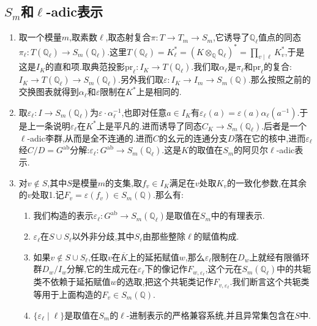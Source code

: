 \subsection{$S_m$和$\ell$-adic表示}
\begin{enumerate}
	\item 取一个模量$m$,取素数$\ell$,取态射复合$\pi:T\to T_m\to S_m$,它诱导了$\mathbb{Q}_{\ell}$值点的同态$\pi_{\ell}:T(\mathbb{Q}_{\ell})\to S_m(\mathbb{Q}_{\ell})$.这里$T(\mathbb{Q}_{\ell})=K_{\ell}^*=(K\otimes_{\mathbb{Q}}\mathbb{Q}_{\ell})^*=\prod_{v\mid\ell}K_v^*$,于是这是$I_K$的直和项.取典范投影$\mathrm{pr}_{\ell}:I_K\to T(\mathbb{Q}_{\ell})$.我们取$\alpha_{\ell}$是$\pi_{\ell}$和$\mathrm{pr}_{\ell}$的复合:$I_K\to T(\mathbb{Q}_{\ell})\to S_m(\mathbb{Q}_{\ell})$.另外我们取$\varepsilon:I_K\to I_m\to S_m(\mathbb{Q})$.那么按照之前的交换图表就得到$\alpha_{\ell}$和$\varepsilon$限制在$K^*$上是相同的.
	\item 取$\varepsilon_{\ell}:I\to S_m(\mathbb{Q}_{\ell})$为$\varepsilon\cdot\alpha_{\ell}^{-1}$,也即对任意$a\in I_K$有$\varepsilon_{\ell}(a)=\varepsilon(a)\alpha_{\ell}(a^{-1})$.于是上一条说明$\varepsilon_{\ell}$在$K^*$上是平凡的.进而诱导了同态$C_K\to S_m(\mathbb{Q}_{\ell})$.后者是一个$\ell$-adic李群,从而是全不连通的.进而$C$的幺元的连通分支$D$落在它的核中,进而$\varepsilon_{\ell}$经$C/D=G^{\mathrm{ab}}$分解:$\varepsilon_{\ell}:G^{\mathrm{ab}}\to S_m(\mathbb{Q}_{\ell})$.这是$K$的取值在$S_m$的阿贝尔$\ell$-adic表示.
	\item 对$v\not\in S$,其中$S$是模量$m$的支集,取$f_v\in I_K$满足在$v$处取$K_v$的一致化参数,在其余的$v$处取1.记$F_v=\varepsilon(f_v)\in S_m(\mathbb{Q})$.那么有:
	\begin{enumerate}[(1)]
		\item 我们构造的表示$\varepsilon_{\ell}:G^{\mathrm{ab}}\to S_m(\mathbb{Q}_{\ell})$是取值在$S_m$中的有理表示.
		\item $\varepsilon_{\ell}$在$S\cup S_{\ell}$以外非分歧,其中$S_{\ell}$由那些整除$\ell$的赋值构成.
		\item 如果$v\not\in S\cup S_{\ell}$,任取$v$在$\overline{K}$上的延拓赋值$w$,那么$\varepsilon_{\ell}$限制在$D_w$上就经有限循环群$D_w/I_w$分解,它的生成元在$\varepsilon_{\ell}$下的像记作$F_{w,\varepsilon_{\ell}}$,这个元在$S_m(\mathbb{Q}_{\ell})$中的共轭类不依赖于延拓赋值$w$的选取,把这个共轭类记作$F_{v,\varepsilon_{\ell}}$.我们断言这个共轭类等用于上面构造的$F_v\in S_m(\mathbb{Q})$.
		\item $\{\varepsilon_{\ell}\mid\ell\}$是取值在$S_m$的$\ell$-进制表示的严格兼容系统,并且异常集包含在$S$中.
	\end{enumerate}
\end{enumerate}




